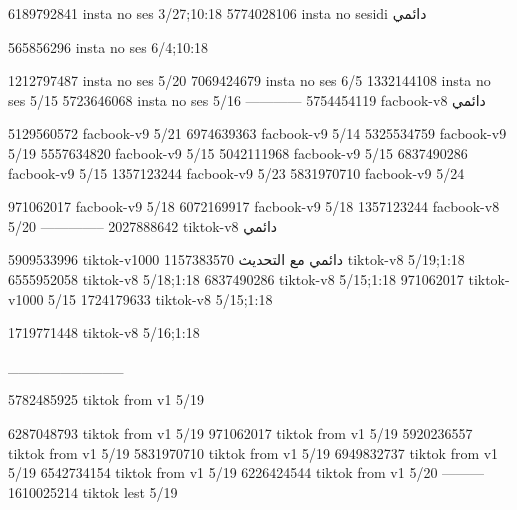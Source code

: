 
6189792841 insta no ses
3/27;10:18
5774028106 insta no sesidi
دائمي


565856296 insta no ses
6/4;10:18


1212797487 insta no ses
5/20
7069424679 insta no ses
6/5
1332144108 insta no ses
5/15
5723646068 insta no ses
5/16
------------
5754454119 facbook-v8
دائمي

5129560572 facbook-v9
5/21
6974639363 facbook-v9
5/14
5325534759 facbook-v9
5/19
5557634820 facbook-v9
5/15
5042111968 facbook-v9
5/15
6837490286 facbook-v9
5/15
1357123244 facbook-v9
5/23
5831970710 facbook-v9
5/24

971062017 facbook-v9
5/18
6072169917 facbook-v9
5/18
1357123244 facbook-v8
5/20
--------------
2027888642 tiktok-v8
دائمي

5909533996 tiktok-v1000
دائمي مع التحديث
1157383570 tiktok-v8
5/19;1:18
6555952058 tiktok-v8
5/18;1:18
6837490286 tiktok-v8
5/15;1:18
971062017 tiktok-v1000
5/15
1724179633 tiktok-v8
5/15;1:18

1719771448 tiktok-v8
5/16;1:18


___________

5782485925 tiktok from v1
5/19

6287048793 tiktok from v1
5/19
971062017 tiktok from v1
5/19
5920236557 tiktok from v1
5/19
5831970710 tiktok from v1
5/19
6949832737 tiktok from v1
5/19
6542734154 tiktok from v1
5/19
6226424544 tiktok from v1
5/20
---------
1610025214 tiktok lest
5/19
